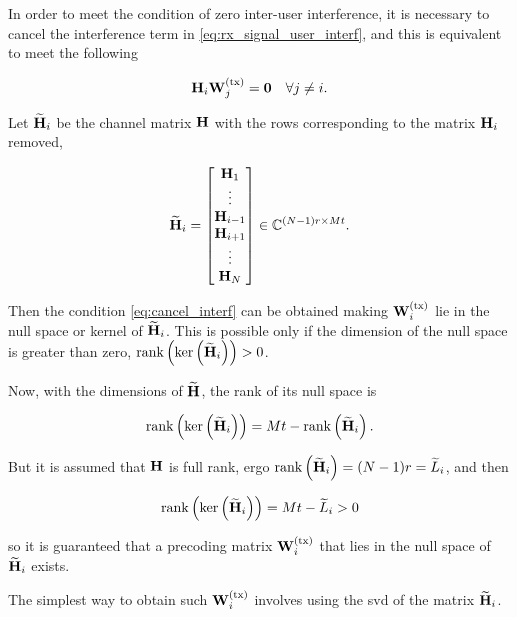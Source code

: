In order to meet the condition of zero inter-user interference, it is necessary
to cancel the interference term in \eqref{eq:rx_signal_user_interf}, and this
is equivalent to meet the following

\begin{equation} \label{eq:cancel_interf}
    \mathbf{H}_i \mathbf{W}^{(\text{tx})}_j = \mathbf{0} \text{\quad } \forall j \neq i.
\end{equation}

Let $\mathbf{\widetilde{H}}_i$ be the channel matrix $\mathbf{H}$ with the rows corresponding to the
matrix $\mathbf{H}_i$ removed, \ie

\begin{equation} \label{eq:h_tilde}
    \mathbf{\widetilde{H}}_i = \begin{bmatrix}
        \mathbf{H}_1 \\
        \vdots \\
        \mathbf{H}_{i - 1} \\
        \mathbf{H}_{i + 1} \\
        \vdots \\
        \mathbf{H}_N
    \end{bmatrix} \in \mathbb{C}^{(N - 1)r \times Mt}.
\end{equation}

Then the condition \eqref{eq:cancel_interf} can be obtained making $\mathbf{W}^{(\text{tx})}_i$ lie
in the null space or kernel of $\mathbf{\widetilde{H}}_i$. This is possible only if the
dimension of the null space is greater than zero, \ie $\operatorname*{rank}\left(\ker
\left(\mathbf{\widetilde{H}}_i\right)\right) > 0$.

Now, with the dimensions of $\mathbf{\widetilde{H}}$, the rank of its null space is

\begin{equation} \label{eq:rank_kern_htilde}
   \operatorname*{rank}\left(\ker\left(\mathbf{\widetilde{H}}_i\right)\right) = Mt - \operatorname*{rank}\left(\mathbf{\widetilde{H}}_i
   \right).
\end{equation}

But it is assumed that $\mathbf{H}$ is full rank, ergo $\operatorname*{rank}\left(\mathbf{\widetilde{H}}_i\right) =
(N - 1)r = \widetilde{L}_i$, and then

\begin{equation} \label{eq:rank_kern_htilde_ok}
    \operatorname*{rank}\left(\ker\left(\mathbf{\widetilde{H}}_i\right)\right) = Mt - \widetilde{L}_i > 0
\end{equation}

\noindent
so it is guaranteed that a precoding matrix $\mathbf{W}^{(\text{tx})}_i$ that lies in the null space
of $\mathbf{\widetilde{H}}_i$ exists.

The simplest way to obtain such $\mathbf{W}^{(\text{tx})}_i$ involves using the \gls{svd} of the
matrix $\mathbf{\widetilde{H}}_i$.

